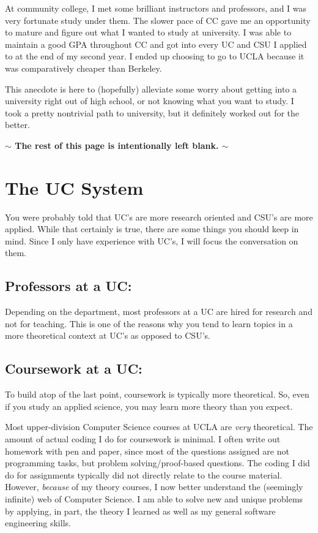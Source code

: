 \documentclass[11pt]{article}
\newenvironment{example}{
\begin{tcolorbox}[title=Example, colback=blue!5!white, colframe=black!75!blue]
}{ \end{tcolorbox} }
\renewcommand{\it}[1]{\textit{{#1}}}
\renewcommand{\bf}[1]{\textbf{{#1}}}
\begin{document}
At community college, I met some brilliant instructors and professors, and I was
very fortunate study under them. The slower pace of CC gave me an opportunity to
mature and figure out what I wanted to study at university. I was able to
maintain a good GPA throughout CC and got into every UC and CSU I applied to at
the end of my second year. I ended up choosing to go to UCLA because it was
comparatively cheaper than Berkeley.
\vspace{1em}

This anecdote is here to (hopefully) alleviate some worry about getting into a
university right out of high school, or not knowing what you want to study. I
took a pretty nontrivial path to university, but it definitely worked out for
the better.
\begin{center}
  \vspace{5em}
  \bf{$\bm{\sim}$ The rest of this page is intentionally left blank. $\bm{\sim}$}
\end{center}

\newpage
\section{The UC System}
\label{sec:uc}
You were probably told that UC's are more research oriented and CSU's are more
applied. While that certainly is true, there are some things you should keep in
mind. Since I only have experience with UC's, I will focus the conversation
on them.

\subsection{Professors at a UC:}
Depending on the department, most professors at a UC are hired for research and
not for teaching. This is one of the reasons why you tend to learn topics in a
more theoretical context at UC's as opposed to CSU's.

\subsection{Coursework at a UC:}
To build atop of the last point, coursework is typically more theoretical. So,
even if you study an applied science, you may learn more theory than you expect.
\begin{example}
  Most upper-division Computer Science courses at UCLA are \it{very} theoretical.
  The amount of actual coding I do for coursework is minimal. I often write out
  homework with pen and paper, since most of the questions assigned are not
  programming tasks, but problem solving/proof-based questions. The
  coding I did do for assignments typically did not directly relate to the
  course material. However, \it{because} of my theory courses, I now better
  understand the (seemingly infinite) web of Computer Science. I am
  able to solve new and unique problems by applying, in part, the theory I
  learned as well as my general software engineering skills.
\end{example}
\end{document}
